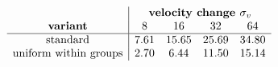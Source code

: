 \[\begin{array}{c|cccc}
      & \multicolumn{4}{c}{\textbf{velocity change }\sigma_v} \\
      \textbf{variant}             & 8    & 16    & 32    & 64    \\ \hline
      \text{standard}              & 7.61 & 15.65 & 25.69 & 34.80 \\
      \text{uniform within groups} & 2.70 & 6.44  & 11.50 & 15.14
\end{array}\]
